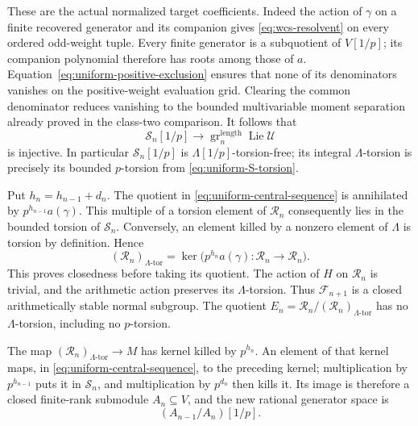 \documentclass[11pt]{article}
\theoremstyle{definition}\newtheorem{definition}[theorem]{Definition}
\begin{document}
These are the actual normalized target coefficients.
Indeed the action of \(\gamma\) on a finite recovered
generator and its companion gives
\eqref{eq:wcs-resolvent} on every ordered odd-weight tuple.
Every finite generator is a subquotient of \(V[1/p]\);
its companion polynomial therefore has roots among those
of \(a\).  Equation~\eqref{eq:uniform-positive-exclusion}
ensures that none of its denominators vanishes on the
positive-weight evaluation grid.  Clearing the common
denominator reduces vanishing to the bounded multivariable
moment separation already proved in the class-two
comparison.  It follows that
\begin{equation}\label{eq:uniform-S-injection}
 \mathcal S_n[1/p]\longrightarrow
   \operatorname{gr}^{\mathrm{length}}_n
                          \operatorname{Lie}\mathcal U
\end{equation}
is injective.  In particular \(\mathcal S_n[1/p]\) is
\(\Lambda[1/p]\)-torsion-free; its integral
\(\Lambda\)-torsion is precisely its bounded
\(p\)-torsion from \eqref{eq:uniform-S-torsion}.

Put \(h_n=h_{n-1}+d_n\).  The quotient in
\eqref{eq:uniform-central-sequence} is annihilated by
\(p^{h_{n-1}}a(\gamma)\).  This multiple of a torsion
element of \(\mathcal R_n\) consequently lies in the bounded
torsion of \(\mathcal S_n\).  Conversely, an element killed
by a nonzero element of \(\Lambda\) is torsion by
definition.  Hence
\begin{equation}\label{eq:uniform-closed-torsion}
 (\mathcal R_n)_{\Lambda\text{-tor}}
           =\ker\bigl(p^{h_n}a(\gamma):\mathcal R_n\to \mathcal R_n\bigr).
\end{equation}
This proves closedness before taking its quotient.
The action of \(H\) on \(\mathcal R_n\) is trivial, and the
arithmetic action preserves its \(\Lambda\)-torsion.
Thus \(\mathcal F_{n+1}\) is a closed arithmetically stable
normal subgroup.  The quotient
\(E_n=\mathcal R_n/(\mathcal R_n)_{\Lambda\text{-tor}}\) has no
\(\Lambda\)-torsion, including no \(p\)-torsion.

The map \((\mathcal R_n)_{\Lambda\text{-tor}}\to M\) has kernel
killed by \(p^{h_n}\).  An element of that kernel maps,
in \eqref{eq:uniform-central-sequence}, to the preceding
kernel; multiplication by \(p^{h_{n-1}}\) puts it in
\(\mathcal S_n\), and multiplication by \(p^{d_n}\) then kills it.
Its image is therefore a closed finite-rank submodule
\(A_n\subseteq V\), and the new rational generator space is
\[
                         (A_{n-1}/A_n)[1/p].
\]
\end{document}
